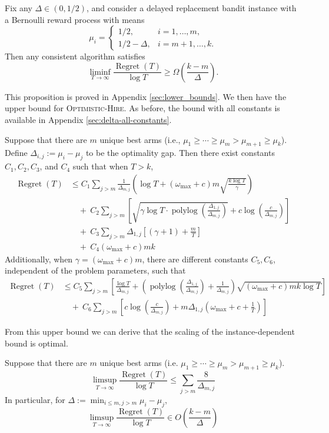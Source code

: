 \documentclass[opre,blindrev]{informs3}
\newcommand{\polylog}{\operatorname{polylog}}
\newcommand{\Regret}{\operatorname{Regret}}
\begin{document}
\begin{proposition}\label{prop:asymptoptic-lower}
    Fix any \(\Delta \in (0,1/2)\), and consider a delayed replacement bandit instance with a Bernoulli reward process with means
    \[\mu_i =\begin{cases}
        1/2, & i = 1,\dots,m,\\
        1/2-\Delta, & i = m+1,\dots,k.
    \end{cases}\]
    Then any consistent algorithm satisfies
    \[
        \liminf_{T\to\infty}\frac{\Regret(T)}{\log T}\geq \Omega\left(\frac{k-m}{\Delta}\right).
    \]
\end{proposition}
This proposition is proved in Appendix \ref{sec:lower_bounds}. We then have the upper bound for \textsc{Optimistic-Hire}. As before, the bound with all constants is available in Appendix \ref{sec:delta-all-constants}.
\begin{theorem}\label{thm:delta-main}
    Suppose that there are \(m\) unique best arms (i.e., \(\mu_1\geq \cdots \geq \mu_m >\mu_{m+1}\geq \mu_k\)). Define \(\Delta_{i,j}:=\mu_i-\mu_j\) to be the optimality gap. Then there exist constants \(C_1,C_2,C_3\), and \(C_4\) such that when \(T>k\),
    \begin{align*}
        \Regret(T)&\leq C_1\sum_{j>m}\frac{1}{\Delta_{m,j}} \left( \log T+(\omega_{\max}+c)m\sqrt{\frac{k\log T}{\gamma }}\right)\\
        &\quad +~ C_2\sum_{j>m} \left[\sqrt{\gamma \log T\cdot \polylog\left(\frac{\Delta_{1,j}}{\Delta_{m,j}}\right)}+c\log\left(\frac{c}{\Delta_{m,j}}\right)\right]\\
        & \quad + ~C_3\sum_{j>m} \Delta_{1,j} \left[(\gamma + 1) + \frac{m}{T}\right]\\
        &\quad +~C_4(\omega_{\max}+c)mk
    \end{align*}
    Additionally, when \(\gamma=(\omega_{\max}+c)m\), there are different constants \(C_5, C_6\), independent of the problem parameters, such that
    \begin{align*}
        \Regret(T)&\leq C_5\sum_{j>m}\left[\frac{\log T}{\Delta_{m,j}}+\left(\polylog\left(\frac{\Delta_{1,j}}{\Delta_{m,j}}\right)+\frac{1}{\Delta_{m,j}}\right)\sqrt{(\omega_{\max}+c)mk\log T}\right]\ \\
        &\quad +~ C_6\sum_{j>m} \left[c\log\left(\frac{c}{\Delta_{m,j}}\right)+m\Delta_{1,j} \left(\omega_{\max}+c + \frac{1}{T}\right)\right]
    \end{align*}
\end{theorem}
From this upper bound we can derive that the scaling of the instance-dependent bound is optimal.
\begin{corollary}
    Suppose that there are \(m\) unique best arms (i.e. \(\mu_1\geq \cdots \geq \mu_m >\mu_{m+1}\geq \mu_k\)).
    \[\limsup_{T\to\infty}\frac{\Regret(T)}{\log T}\leq \sum_{j>m}\frac{8}{\Delta_{m,j}}\]
    In particular, for \(\Delta:=\min_{i\leq m,j>m}\mu_i-\mu_j\),
    \[\limsup_{T\to\infty}\frac{\Regret(T)}{\log T}\in O\!\left(\frac{k-m}{\Delta}\right)\]
\end{corollary}
\end{document}
